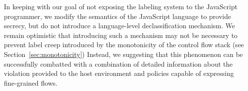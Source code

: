 In keeping with our goal of not exposing the labeling system to the JavaScript programmer, we modify the semantics of the JavaScript language to provide secrecy, but do not introduce a language-level declassification mechanism.
We remain optimistic that introducing such a mechanism may not be necessary to prevent label creep introduced by the monotonicity of the control flow stack (see Section~\ref{sec:monotonicity})
Instead, we suggesting that this phenomenon can be successfully combatted with a combination of detailed information about the violation provided to the host environment and policies capable of expressing fine-grained flows.



